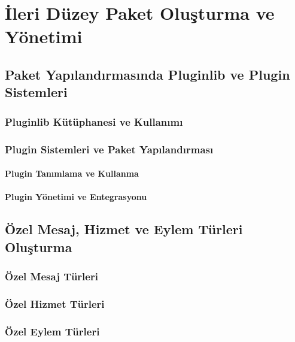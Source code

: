 \chapter{İleri Düzey Paket Oluşturma ve Yönetimi}

\section{Paket Yapılandırmasında Pluginlib ve Plugin Sistemleri}
\subsection{Pluginlib Kütüphanesi ve Kullanımı}
\lipsum[1] %

\subsection{Plugin Sistemleri ve Paket Yapılandırması}
\lipsum[2] %

\subsubsection{Plugin Tanımlama ve Kullanma}
\lipsum[3] %

\subsubsection{Plugin Yönetimi ve Entegrasyonu}
\lipsum[4] %

\section{Özel Mesaj, Hizmet ve Eylem Türleri Oluşturma}
\subsection{Özel Mesaj Türleri}
\lipsum[5] %

\subsection{Özel Hizmet Türleri}
\lipsum[6] %

\subsection{Özel Eylem Türleri}
\lipsum[7] %
